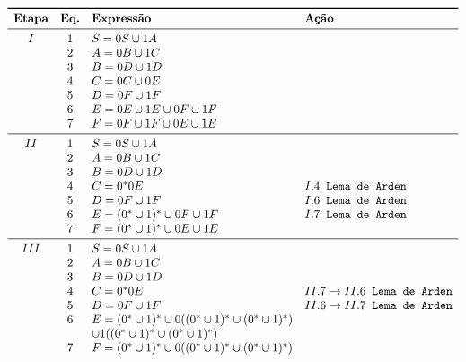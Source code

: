 \documentclass[12pt]{article}
\begin{document}
\begin{tcolorbox}[breakable,rounded corners, colback=yellow!5, colframe=red!40!black, title={Extração de expressão regular $\mathcal{R}_2$ da gramática $G_2$, tal que $\mathcal{L}(\mathcal{R}_2)=\mathcal{L}(G_2)$}]
  $$
  \begin{array}{ccll}
  \toprule
  \textbf{Etapa} & \textbf{Eq.} & \textbf{Expressão} & \textbf{Ação}\\
  \midrule
    I & 1 & S = 0S \cup 1A               &\\
      & 2 & A = 0B \cup 1C               &\\
      & 3 & B = 0D \cup 1D               &\\
      & 4 & C = 0C \cup 0E               &\\
      & 5 & D = 0F \cup 1F               &\\
      & 6 & E = 0E \cup 1E \cup 0F \cup 1F              &\\
      & 7 & F = 0F \cup 1F \cup 0E \cup 1E&\\
  \midrule
   II & 1 & S = 0S \cup 1A               &\\
      & 2 & A = 0B \cup 1C               &\\
      & 3 & B = 0D \cup 1D               &\\
      & 4 & C = 0^*0E               &I.4\texttt{ Lema de Arden}\\
      & 5 & D = 0F \cup 1F               &I.6\texttt{ Lema de Arden}\\
      & 6 & E = (0^*\cup1)^* \cup 0F \cup 1F              &I.7\texttt{ Lema de Arden}\\
      & 7 & F = (0^*\cup1)^* \cup 0E \cup 1E&\\
  \midrule
  III & 1 & S = 0S \cup 1A               &\\
      & 2 & A = 0B \cup 1C               &\\
      & 3 & B = 0D \cup 1D               &\\
      & 4 & C = 0^*0E               &II.7 \to II.6\texttt{ Lema de Arden}\\
      & 5 & D = 0F \cup 1F               &II.6 \to II.7\texttt{ Lema de Arden}\\
      & 6 & E = (0^*\cup1)^* \cup 0((0^*\cup1)^* \cup (0^*\cup1)^*)&\\ & & \cup 1((0^*\cup1)^* \cup (0^*\cup1)^*)              &\\
      & 7 & F = (0^*\cup1)^* \cup 0((0^*\cup1)^* \cup (0^*\cup1)^*) &\\

\end{array}$$
\end{tcolorbox}
\end{document}
